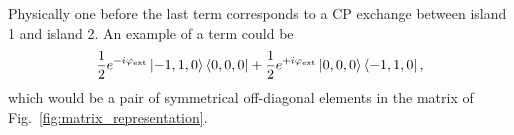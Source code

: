 \documentclass[%
superscriptaddress,
preprint,
preprintnumbers,
bibnotes,
amsmath,
amssymb,
aps,
showkeys,
prb,
]{revtex4-1}
\newcommand{\blue}[1]{\textcolor{blue}{#1}}
\newcommand{\iketbra}[2]{\ket{#1}\bra{#2}}
\begin{document}
% 
  

Physically one before the last term corresponds  to a CP exchange between island 1 and  island 2. An example
  of a term could be
  \begin{equation}
    \label{eq:ab6}
    \frac{1}{2}e^{-i\varphi_{\text{ext}}}\iketbra{-1,1,0}{0,0,0} + \frac{1}{2}e^{+i\varphi_{\text{ext}}}\iketbra{0,0,0}{-1,1,0},
  \end{equation}
  \noindent  which would  be a  pair of  symmetrical off-diagonal  elements in  the matrix  of
  Fig.~\ref{fig:matrix_representation}.
\end{document}
